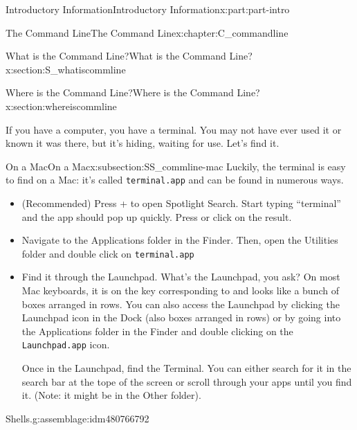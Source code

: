 \documentclass[oneside,10pt,]{book}
\newcommand{\mono}[1]{\texttt{#1}}
\newcommand{\kbd}[1]{\keys{{#1}}}
\begin{document}
\begin{partptx}{Introductory Information}{}{Introductory Information}{}{}{x:part:part-intro}
\begin{chapterptx}{The Command Line}{}{The Command Line}{}{}{x:chapter:C_commandline}
\begin{sectionptx}{What is the Command Line?}{}{What is the Command Line?}{}{}{x:section:S_whatiscommline}
\end{sectionptx}
%
%
\typeout{************************************************}
\typeout{************************************************}
%
\begin{sectionptx}{Where is the Command Line?}{}{Where is the Command Line?}{}{}{x:section:whereiscommline}
%
%
\begin{introduction}{}%
If you have a computer, you have a terminal. You may not have ever used it or known it was there, but it's hiding, waiting for use. Let's find it.%
\end{introduction}%
%
%
\typeout{************************************************}
\typeout{************************************************}
%
\begin{subsectionptx}{On a Mac}{}{On a Mac}{}{}{x:subsection:SS_commline-mac}
%
Luckily, the terminal is easy to find on a Mac: it's called \mono{terminal.app} and can be found in numerous ways.%
\begin{itemize}[label=\textbullet]
\item{}(Recommended) Press \kbd{Command} + \kbd{Space} to open Spotlight Search. Start typing ``terminal'' and the app should pop up quickly. Press \kbd{Enter} or click on the result.%
\item{}Navigate to the Applications folder in the Finder. Then, open the Utilities folder and double click on \mono{terminal.app}%
\item{}Find it through the Launchpad. What's the Launchpad, you ask? On most Mac keyboards, it is on the key corresponding to \kbd{F4} and looks like a bunch of boxes arranged in rows. You can also access the Launchpad by clicking the Launchpad icon in the Dock (also boxes arranged in rows) or by going into the Applications folder in the Finder and double clicking on the \mono{Launchpad.app} icon.%
\par
Once in the Launchpad, find the Terminal. You can either search for it in the search bar at the tope of the screen or scroll through your apps until you find it. (Note: it might be in the Other folder).%
\end{itemize}
%
\begin{assemblage}{Shells.}{g:assemblage:idm480766792}%

\end{assemblage}
\end{subsectionptx}
\end{sectionptx}
\end{chapterptx}
\end{partptx}
\end{document}

